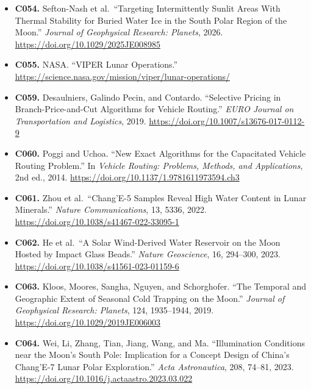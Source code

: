 \documentclass[
  11pt,
]{article}
\begin{document}
\begin{itemize}
  2023. \url{https://doi.org/10.1016/j.actaastro.2022.12.023}
\item
  \textbf{C054.} Sefton-Nash et al.~``Targeting Intermittently Sunlit
  Areas With Thermal Stability for Buried Water Ice in the South Polar
  Region of the Moon.'' \emph{Journal of Geophysical Research: Planets},
  2026. \url{https://doi.org/10.1029/2025JE008985}
\item
  \textbf{C055.} NASA. ``VIPER Lunar Operations.''
  \url{https://science.nasa.gov/mission/viper/lunar-operations/}
\item
  \textbf{C059.} Desaulniers, Galindo Pecin, and Contardo. ``Selective
  Pricing in Branch-Price-and-Cut Algorithms for Vehicle Routing.''
  \emph{EURO Journal on Transportation and Logistics}, 2019.
  \url{https://doi.org/10.1007/s13676-017-0112-9}
\item
  \textbf{C060.} Poggi and Uchoa. ``New Exact Algorithms for the
  Capacitated Vehicle Routing Problem.'' In \emph{Vehicle Routing:
  Problems, Methods, and Applications}, 2nd ed., 2014.
  \url{https://doi.org/10.1137/1.9781611973594.ch3}
\item
  \textbf{C061.} Zhou et al.~``Chang'E-5 Samples Reveal High Water
  Content in Lunar Minerals.'' \emph{Nature Communications}, 13, 5336,
  2022. \url{https://doi.org/10.1038/s41467-022-33095-1}
\item
  \textbf{C062.} He et al.~``A Solar Wind-Derived Water Reservoir on the
  Moon Hosted by Impact Glass Beads.'' \emph{Nature Geoscience}, 16,
  294--300, 2023. \url{https://doi.org/10.1038/s41561-023-01159-6}
\item
  \textbf{C063.} Kloos, Moores, Sangha, Nguyen, and Schorghofer. ``The
  Temporal and Geographic Extent of Seasonal Cold Trapping on the
  Moon.'' \emph{Journal of Geophysical Research: Planets}, 124,
  1935--1944, 2019. \url{https://doi.org/10.1029/2019JE006003}
\item
  \textbf{C064.} Wei, Li, Zhang, Tian, Jiang, Wang, and Ma.
  ``Illumination Conditions near the Moon's South Pole: Implication for
  a Concept Design of China's Chang'E-7 Lunar Polar Exploration.''
  \emph{Acta Astronautica}, 208, 74--81, 2023.
  \url{https://doi.org/10.1016/j.actaastro.2023.03.022}
\end{itemize}
\end{document}
